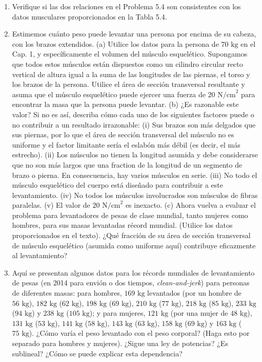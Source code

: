 \documentclass[12pt]{book}
\begin{document}
\begin{enumerate}
\item[5.5] Verifique si las dos relaciones en el Problema 5.4 son consistentes con los datos musculares proporcionados en la Tabla 5.4.

\item[5.6] Estimemos cuánto peso puede levantar una persona por encima de su cabeza, con los brazos extendidos. (a) Utilice los datos para la persona de $70\text{ kg}$ en el Cap. 1, y específicamente el volumen del músculo esquelético. Supongamos que todos estos músculos están dispuestos como un cilindro circular recto vertical de altura igual a la suma de las longitudes de las piernas, el torso y los brazos de la persona. Utilice el área de sección transversal resultante y asuma que el músculo esquelético puede ejercer una fuerza de $20\text{ N/cm}^2$ para encontrar la masa que la persona puede levantar. (b) ¿Es razonable este valor? Si no es así, describa cómo cada uno de los siguientes factores puede o no contribuir a un resultado irrazonable: (i) Sus brazos son más delgados que sus piernas, por lo que el área de sección transversal del músculo no es uniforme y el factor limitante sería el eslabón más débil (es decir, el más estrecho). (ii) Los músculos no tienen la longitud asumida y debe considerarse que no son más largos que una fraction de la longitud de un segmento de brazo o pierna. En consecuencia, hay varios músculos en serie. (iii) No todo el músculo esquelético del cuerpo está diseñado para contribuir a este levantamiento. (iv) No todos los músculos involucrados son músculos de fibras paralelas. (v) El valor de $20\text{ N/cm}^2$ es inexacto. (c) Ahora vuelva a evaluar el problema para levantadores de pesas de clase mundial, tanto mujeres como hombres, para sus masas levantadas récord mundial. (Utilice los datos proporcionados en el texto). ¿Qué fracción de su área de sección transversal de músculo esquelético (asumida como uniforme aquí) contribuye eficazmente al levantamiento?

\item[5.7] Aquí se presentan algunos datos para los récords mundiales de levantamiento de pesas (en 2014 para envión o dos tiempos, \textit{clean-and-jerk}) para personas de diferentes masas: para hombres, $169\text{ kg}$ levantados (por un hombre de $56\text{ kg}$), $182\text{ kg}$ ($62\text{ kg}$), $198\text{ kg}$ ($69\text{ kg}$), $210\text{ kg}$ ($77\text{ kg}$), $218\text{ kg}$ ($85\text{ kg}$), $233\text{ kg}$ ($94\text{ kg}$) y $238\text{ kg}$ ($105\text{ kg}$); y para mujeres, $121\text{ kg}$ (por una mujer de $48\text{ kg}$), $131\text{ kg}$ ($53\text{ kg}$), $141\text{ kg}$ ($58\text{ kg}$), $143\text{ kg}$ ($63\text{ kg}$), $158\text{ kg}$ ($69\text{ kg}$) y $163\text{ kg}$ ($75\text{ kg}$). ¿Cómo varía el peso levantado con el peso corporal? (Haga esto por separado para hombres y mujeres). ¿Sigue una ley de potencias? ¿Es sublineal? ¿Cómo se puede explicar esta dependencia?


\end{enumerate}
\end{document}
